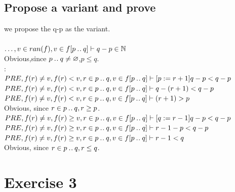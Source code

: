 \documentclass[11pt,a4paper,fleqn]{article}
\begin{document}
\subsection{Propose a variant and prove}
\noindent              
we propose the q-p as the variant.\\
\\
$\ldots,v\in ran(f),v\in f[p\mathbin{.\mkern1mu.} q]\vdash q-p\in\mathbb{N}$\\
Obvious,since $p\mathbin{.\mkern1mu.} q\not=\mathord\varnothing$,$p\leq q$.\\
:\\
$PRE,f(r)\not=v,f(r)<v,r\in p\mathbin{.\mkern1mu.} q,v\in f[p\mathbin{.\mkern1mu.}   q]\vdash [p:=r+1]q-p<q-p$\\
$PRE,f(r)\not=v,f(r)<v,r\in p\mathbin{.\mkern1mu.} q,v\in f[p\mathbin{.\mkern1mu.}   q]\vdash q-(r+1)<q-p$\\
$PRE,f(r)\not=v,f(r)<v,r\in p\mathbin{.\mkern1mu.} q,v\in f[p\mathbin{.\mkern1mu.}   q]\vdash (r+1)>p$\\
Obvious, since $r\in p\mathbin{.\mkern1mu.} q,r\geq p$.\\
$PRE,f(r)\not=v,f(r)\geq v,r\in p\mathbin{.\mkern1mu.} q,v\in f[p\mathbin{.\mkern1mu.}   q]\vdash [q:=r-1]q-p<q-p$\\
$PRE,f(r)\not=v,f(r)\geq v,r\in p\mathbin{.\mkern1mu.} q,v\in f[p\mathbin{.\mkern1mu.}   q]\vdash r-1-p<q-p$\\
$PRE,f(r)\not=v,f(r)\geq v,r\in p\mathbin{.\mkern1mu.} q,v\in f[p\mathbin{.\mkern1mu.}   q]\vdash r-1<q$\\
Obvious, since $r\in p\mathbin{.\mkern1mu.} q,r\leq q$.
\section{Exercise 3}
\end{document}
